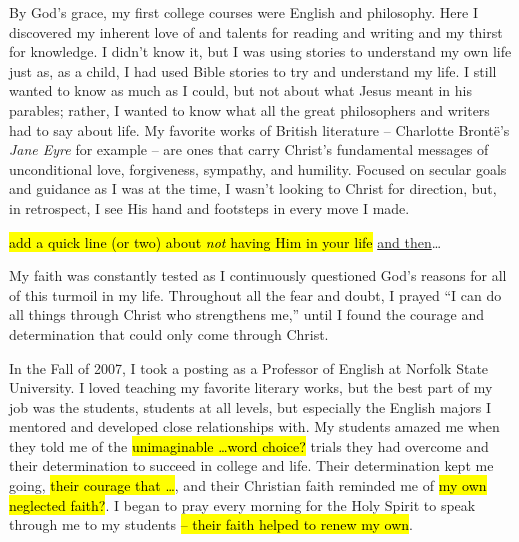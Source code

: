 \documentclass{article}%
\begin{document}
By God's grace, my first college courses were English and philosophy. 
Here I discovered my inherent love of and talents for reading and writing and my thirst for knowledge.  
I didn't know it, but I was using stories to understand my own life just as, as a child,  I had used Bible stories to try and  understand my life. I still wanted to know as much as I could, but not about what Jesus meant in his parables; rather, I wanted to know what all the great philosophers and writers had to say about life. 
My favorite works of British literature -- Charlotte Bront\"e's \emph{Jane Eyre} for example -- are ones that carry Christ's fundamental messages of unconditional love, forgiveness, sympathy, and humility. 
Focused on secular goals and guidance as I was at the time, I wasn't looking to Christ for direction, but, in retrospect, I see His hand and footsteps in every move I made. 



\hl{add a quick line (or two) about \emph{not} having Him in your life} \ul{and then}\dots{}


My faith was constantly tested as I continuously questioned God's reasons for all of this turmoil in my life. 
Throughout all the fear and doubt, I prayed ``I can do all things through Christ who strengthens me,'' until I found the courage and determination that could only come through Christ. 





In the Fall of 2007, I took a posting as a Professor of English  at Norfolk State University. 
I loved teaching my favorite literary works, but the best part of my job was the students, students at all levels, but especially the English majors I mentored and developed close relationships with.
My students amazed me when they told me of the \hl{unimaginable  \dots word choice?} trials they had overcome and their determination to succeed in college and life. 
Their determination kept me going, \hl{their courage that \dots}, and their Christian faith reminded me of \hl{my own neglected faith?}. 
I began to pray every morning for the Holy Spirit to speak through me to my students \hl{-- their faith helped to renew my own}.  %
\end{document}
